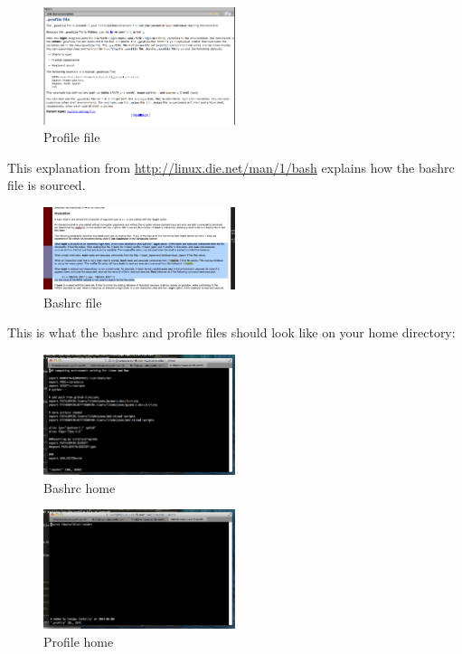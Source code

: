 \documentclass[letterpaper,10pt]{article}
\begin{document}
\begin{figure}[h!]
  \centering
  \includegraphics[width=0.5\textwidth]{images/profile_file}
  \caption{Profile file}
  \label{fig:profile_file}
\end{figure}

This explanation from \url{http://linux.die.net/man/1/bash} explains how the bashrc file is sourced. 

\begin{figure}[h!]
  \centering
  \includegraphics[width=0.5\textwidth]{images/bashrc_file}
  \caption{Bashrc file}
  \label{fig:bashrc_file}
\end{figure}

This is what the bashrc and profile files should look like on your home directory:

\begin{figure}[h!]
  \centering
  \includegraphics[width=0.5\textwidth]{images/bashrc_home}
  \caption{Bashrc home}
  \label{fig:bashrc_home}
\end{figure}

\begin{figure}[h!]
  \centering
  \includegraphics[width=0.5\textwidth]{images/profile_home}
  \caption{Profile home}
  \label{fig:profile_home}
\end{figure}
\end{document}
